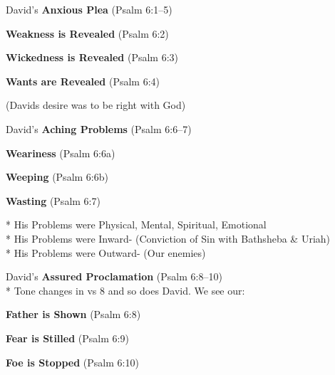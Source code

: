 \begin{compactenum}[I.]
    \item David’s \textbf{ Anxious Plea}   (Psalm 6:1--5)
    \begin{compactenum}[A.]
    		\item \textbf{Weakness is Revealed}   (Psalm 6:2)
    		\item \textbf{Wickedness is Revealed}   (Psalm 6:3)
    		\item \textbf{Wants are Revealed}   (Psalm 6:4)
	\end{compactenum}
	(Davids desire was to be right with God)
    \item David’s \textbf{Aching Problems}   (Psalm 6:6--7)
    \begin{compactenum}[A.]
    		\item \textbf{Weariness}  (Psalm 6:6a)
    		\item \textbf{Weeping}  (Psalm 6:6b)
    		\item \textbf{Wasting}  (Psalm 6:7)
	\end{compactenum}
	* His Problems were Physical, Mental, Spiritual, Emotional\\
     * His Problems were Inward- (Conviction of Sin with Bathsheba \& Uriah)\\
     * His Problems were Outward- (Our enemies)
    \item David’s \textbf{Assured Proclamation}   (Psalm 6:8--10)\\
    * Tone changes in vs 8 and so does David. We see our:
    \begin{compactenum}[I.]
        \item \textbf{Father is Shown}   (Psalm 6:8)
        \item \textbf{Fear is Stilled}   (Psalm 6:9)
        \item \textbf{Foe is Stopped}   (Psalm 6:10)
    \end{compactenum}
\end{compactenum}
